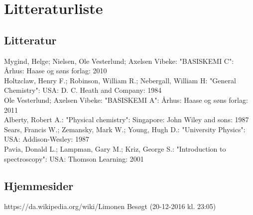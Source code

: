 \section{Litteraturliste}
\subsection*{Litteratur}
Mygind, Helge; Nielsen, Ole Vesterlund; Axelsen Vibeke: "BASISKEMI C": Århus: Haase og søns forlag: 2010
\\

Holtzclaw, Henry F.; Robinson, William R.; Nebergall, William H: "General Chemistry": USA: D. C. Heath and Company: 1984
\\

Ole Vesterlund; Axelsen Vibeke: "BASISKEMI A": Århus: Haase og søns forlag: 2011
\\

Alberty, Robert A.: "Physical chemistry": Singapore: John Wiley and sons: 1987
\\

Sears, Francis W.; Zemansky, Mark W.; Young, Hugh D.: "University Physics": USA: Addison-Wesley: 1987
\\

Pavia, Donald L.; Lampman, Gary M.; Kriz, George S.: "Introduction to spectroscopy": USA: Thomson Learning: 2001

\subsection{Hjemmesider}
https://da.wikipedia.org/wiki/Limonen Besøgt (20-12-2016 kl. 23:05)